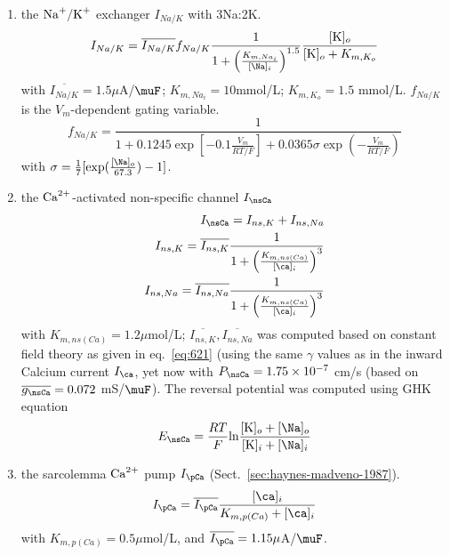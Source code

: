 \begin{enumerate}
\item the $\ce{Na+}/\ce{K+}$ exchanger $I_{Na/K}$ with 3Na:2K.
  \begin{equation}
    \label{eq:771}
    I_{Na/K} = \overline{I_{Na/K}} f_{Na/K}
    \frac{1}{1+\left(\frac{K_{m,Na_i}}{[\Na]_i}\right)^{1.5}} \frac{[\ce{K}]_o}{[\ce{K}]_o+K_{m,K_o}}
  \end{equation}
  with $\overline{I_{Na/K}}=1.5\mu$A/$\muF$; $K_{m,Na_i}=10$mmol/L;
  $K_{m,K_o}=1.5$ mmol/L.  $f_{Na/K}$ is the $V_m$-dependent gating
  variable.
  \begin{equation}
    \label{eq:764}
    f_{Na/K} = \frac{1}{1+0.1245\exp[-0.1\frac{V_m}{RT/F}]+0.0365 \sigma \exp(-\frac{V_m}{RT/F})}
  \end{equation}
with $\sigma = \frac{1}{7}[\exp(\frac{[\Na]_o}{67.3}) -1 ]$.

\item the ${\text{Ca}^{2+}}$-activated non-specific channel $I_\nsCa$
\begin{equation}
  \label{eq:765}
  \begin{split}
      I_\nsCa = I_{ns,K} + I_{ns,Na} \\
      I_{ns,K} = \overline{I_{ns,K}}
      \frac{1}{1+\left(\frac{K_{m,ns(Ca)}}{[\ca]_i}\right)^3} \\
      I_{ns,Na} = \overline{I_{ns,Na}}
        \frac{1}{1+\left(\frac{K_{m,ns(Ca)}}{[\ca]_i}\right)^3} \\
  \end{split}
\end{equation}
with $K_{m,ns(Ca)} = 1.2\mu$mol/L;
$\overline{I_{ns,K}},\overline{I_{ns,Na}}$ was computed based on
constant field theory as given in eq.~\eqref{eq:621} (using the same
$\gamma$ values as in the inward Calcium current $I_\ca $, yet now
with $P_\nsCa = 1.75\times 10^{-7}$ cm/s (based on
$\overline{g_\nsCa}=0.072$ mS/$\muF$).  The reversal potential was
computed using GHK equation
\begin{equation}
  \label{eq:769}
  E_\nsCa = \frac{RT}{F} \ln\frac{[\ce{K}]_o+[\Na]_o}{[\ce{K}]_i+[\Na]_i}
\end{equation}

\item the sarcolemma ${\text{Ca}^{2+}}$ pump $I_\pCa$
  (Sect.~\ref{sec:haynes-madveno-1987}).
\begin{equation}
  \label{eq:772}
I_\pCa = \overline{I_\pCa} \frac{[\ca]_i}{K_{m,p(Ca)}+ [\ca]_i}  
\end{equation}
with $K_{m,p(Ca)}=0.5\mu$mol/L, and $\overline{I_\pCa} =
1.15\mu$A/$\muF$. 


\end{enumerate}
